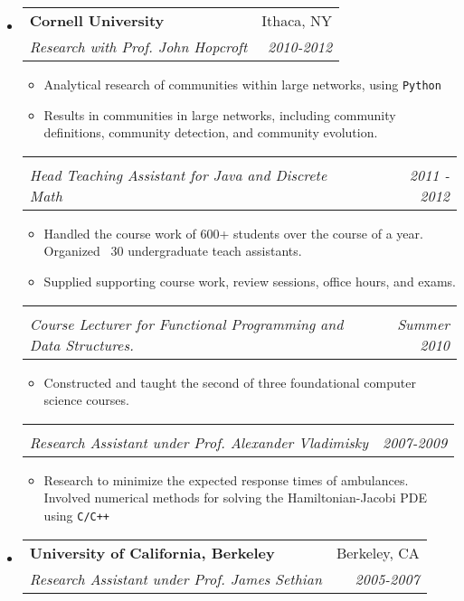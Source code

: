\documentclass[letterpaper,11pt]{article}
\makeatletter
\newcommand{\resitem}[1]{\item #1 \vspace{-2pt}}
\newcommand{\ressubheading}[4]{

\begin{tabular*}{6.5in}{l@{\cftdotfill{\cftsecdotsep}\extracolsep{\fill}}r}

		\textbf{#1} & #2 \\

		\textit{#3} & \textit{#4} \\

\end{tabular*}\vspace{-6pt}}
\makeatother
\begin{document}
\begin{itemize}
\item
	\ressubheading{\color{darkred}Cornell University}{Ithaca, NY}{Research with Prof. John Hopcroft }{2010-2012}

	\begin{itemize}

		\resitem{Analytical research of communities within large networks, using \texttt{Python}}

		\resitem{Results in communities in large networks, including community definitions, community detection, and community evolution.}

	\end{itemize}


	\ressubheading{}{}{Head Teaching Assistant for Java and Discrete Math}{2011 - 2012}

	\begin{itemize}

		\resitem{Handled the course work of 600+ students over the course of a year. Organized ~30 undergraduate teach assistants.}

		\resitem{Supplied supporting course work, review sessions, office hours, and exams.}

	\end{itemize}

	\ressubheading{}{}{Course Lecturer for Functional Programming and Data Structures.}{Summer 2010}

	\begin{itemize}

		\resitem{Constructed and taught the second of three foundational computer science courses.}

	\end{itemize}

	\ressubheading{}{}{Research Assistant under Prof. Alexander Vladimisky }{2007-2009}

	\begin{itemize}

		\resitem{Research to minimize the expected response times of ambulances. Involved numerical methods for solving the Hamiltonian-Jacobi PDE using \texttt{C/C++}}

	\end{itemize}


\item 

	\ressubheading{\color{deepblue}University of California, Berkeley}{Berkeley, CA}{Research Assistant under Prof. James Sethian}{2005-2007}

	\begin{itemize}


\end{itemize}
\end{itemize}
\end{document}
